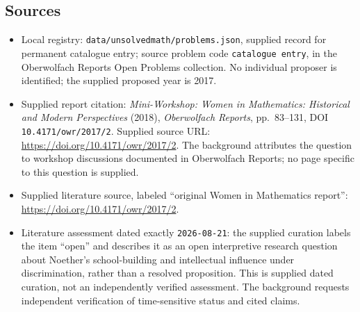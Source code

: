 \documentclass[11pt]{article}
\begin{document}
\subsection{Sources}
\begin{itemize}
\item Local registry: \texttt{data/unsolvedmath/problems.json}, supplied record for permanent catalogue entry; source problem code \texttt{catalogue entry}, in the Oberwolfach Reports Open Problems collection. No individual proposer is identified; the supplied proposed year is 2017.
\item Supplied report citation: \emph{Mini-Workshop: Women in Mathematics: Historical and Modern Perspectives} (2018), \emph{Oberwolfach Reports}, pp.\ 83--131, DOI \texttt{10.4171/owr/2017/2}. Supplied source URL: \url{https://doi.org/10.4171/owr/2017/2}. The background attributes the question to workshop discussions documented in Oberwolfach Reports; no page specific to this question is supplied.
\item Supplied literature source, labeled ``original Women in Mathematics report'': \url{https://doi.org/10.4171/owr/2017/2}.
\item Literature assessment dated exactly \texttt{2026-08-21}: the supplied curation labels the item ``open'' and describes it as an open interpretive research question about Noether's school-building and intellectual influence under discrimination, rather than a resolved proposition. This is supplied dated curation, not an independently verified assessment. The background requests independent verification of time-sensitive status and cited claims.
\end{itemize}
\end{document}
